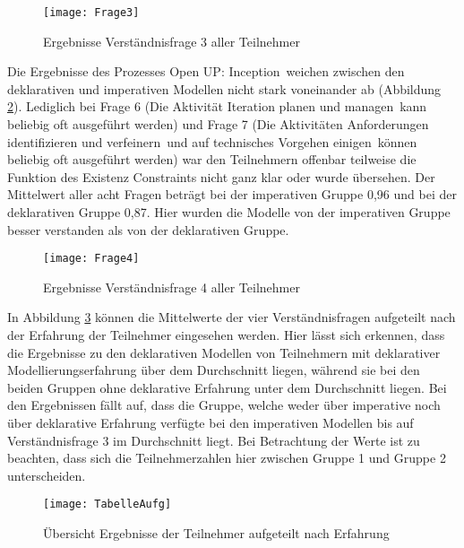 \begin{figure}[htp]
\begin{center}
  \texttt{[image: Frage3]} %
  \caption{Ergebnisse Verständnisfrage 3 aller Teilnehmer}
  \label{fig:Frage3}
\end{center}
\end{figure}

Die Ergebnisse des Prozesses \grqq Open UP: Inception\grqq \ weichen zwischen den deklarativen und imperativen Modellen nicht stark voneinander ab (Abbildung \ref{fig:Frage4}). \newline
Lediglich bei Frage 6 (\grqq Die Aktivität \grqq Iteration planen und managen\grqq \ kann beliebig oft ausgeführt werden\grqq) und Frage 7 (\grqq Die Aktivitäten \grqq Anforderungen identifizieren und verfeinern\grqq \ und \grqq auf technisches Vorgehen einigen\grqq \ können beliebig oft ausgeführt werden) war den Teilnehmern offenbar teilweise die Funktion des Existenz Constraints nicht ganz klar oder wurde übersehen.\newline
Der Mittelwert aller acht Fragen beträgt bei der imperativen Gruppe 0,96 und bei der deklarativen Gruppe 0,87. Hier wurden die Modelle von der imperativen Gruppe besser verstanden als von der deklarativen Gruppe. \newline


\begin{figure}[htp]
\begin{center}
  \texttt{[image: Frage4]} %
  \caption{Ergebnisse Verständnisfrage 4 aller Teilnehmer}
  \label{fig:Frage4}
\end{center}
\end{figure}

In Abbildung \ref{fig:TabelleAufg} können die Mittelwerte der vier Verständnisfragen aufgeteilt nach der Erfahrung der Teilnehmer eingesehen werden. Hier lässt sich erkennen, dass die Ergebnisse zu den deklarativen Modellen von Teilnehmern mit deklarativer Modellierungserfahrung über dem Durchschnitt liegen, während sie bei den beiden Gruppen ohne deklarative Erfahrung unter dem Durchschnitt liegen. \newline
Bei den Ergebnissen fällt auf, dass die Gruppe, welche weder über imperative noch über deklarative Erfahrung verfügte bei den imperativen Modellen bis auf Verständnisfrage 3 im Durchschnitt liegt. Bei Betrachtung der Werte ist zu beachten, dass sich die Teilnehmerzahlen hier zwischen Gruppe 1 und Gruppe 2 unterscheiden.\newline
\begin{figure}[htp]
\begin{center}
  \texttt{[image: TabelleAufg]} %
  \caption{Übersicht Ergebnisse der Teilnehmer aufgeteilt nach Erfahrung}
  \label{fig:TabelleAufg}
\end{center}
\end{figure}




